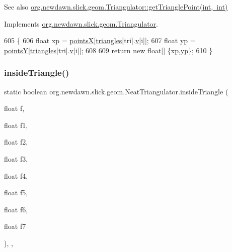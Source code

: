 \begin{DoxySeeAlso}{See also}
\mbox{\hyperlink{interfaceorg_1_1newdawn_1_1slick_1_1geom_1_1_triangulator_a0142ec1a5f11292813f0f4e9a1407efb}{org.\+newdawn.\+slick.\+geom.\+Triangulator\+::get\+Triangle\+Point(int, int)}} 
\end{DoxySeeAlso}


Implements \mbox{\hyperlink{interfaceorg_1_1newdawn_1_1slick_1_1geom_1_1_triangulator_a0142ec1a5f11292813f0f4e9a1407efb}{org.\+newdawn.\+slick.\+geom.\+Triangulator}}.


\begin{DoxyCode}
605                                                     \{
606         \textcolor{keywordtype}{float} xp = \mbox{\hyperlink{classorg_1_1newdawn_1_1slick_1_1geom_1_1_neat_triangulator_a651e2f489c027306dacf8b03fb0f04a0}{pointsX}}[\mbox{\hyperlink{classorg_1_1newdawn_1_1slick_1_1geom_1_1_neat_triangulator_a007f9ede3582ce3c9c1439b40e4e5f55}{triangles}}[tri].\mbox{\hyperlink{classorg_1_1newdawn_1_1slick_1_1geom_1_1_neat_triangulator_1_1_triangle_a2b3db61035c03f006545b890dccf89a0}{v}}[i]];
607         \textcolor{keywordtype}{float} yp = \mbox{\hyperlink{classorg_1_1newdawn_1_1slick_1_1geom_1_1_neat_triangulator_ac4491217b5be9c7a1ccbdb5511f832d9}{pointsY}}[\mbox{\hyperlink{classorg_1_1newdawn_1_1slick_1_1geom_1_1_neat_triangulator_a007f9ede3582ce3c9c1439b40e4e5f55}{triangles}}[tri].\mbox{\hyperlink{classorg_1_1newdawn_1_1slick_1_1geom_1_1_neat_triangulator_1_1_triangle_a2b3db61035c03f006545b890dccf89a0}{v}}[i]];
608         
609         \textcolor{keywordflow}{return} \textcolor{keyword}{new} \textcolor{keywordtype}{float}[] \{xp,yp\};
610     \}
\end{DoxyCode}
\mbox{\label{classorg_1_1newdawn_1_1slick_1_1geom_1_1_neat_triangulator_a95e47c0ce903fd1ea4ed9d7143c10ca8}} 
\subsubsection{\texorpdfstring{inside\+Triangle()}{insideTriangle()}}
{\footnotesize\ttfamily static boolean org.\+newdawn.\+slick.\+geom.\+Neat\+Triangulator.\+inside\+Triangle (\begin{DoxyParamCaption}\item[{float}]{f,  }\item[{float}]{f1,  }\item[{float}]{f2,  }\item[{float}]{f3,  }\item[{float}]{f4,  }\item[{float}]{f5,  }\item[{float}]{f6,  }\item[{float}]{f7 }\end{DoxyParamCaption})\hspace{0.3cm}{\ttfamily [inline]}, {\ttfamily [static]}, {\ttfamily [private]}}

